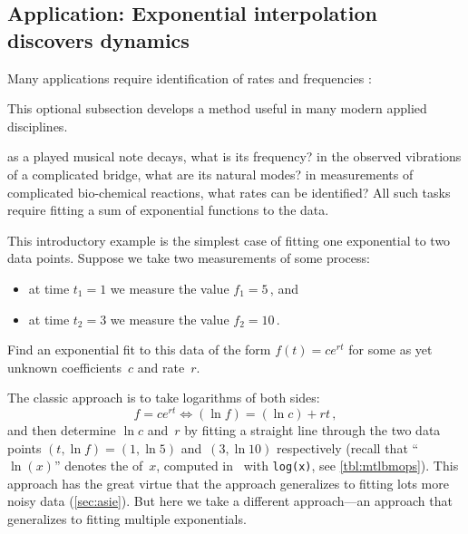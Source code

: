 









\begin{reduce}
\subsection{Application: Exponential interpolation discovers dynamics}
\label{sec:eidd}


Many applications require identification of rates and frequencies \cite[e.g.]{Pereyra2010}:
\begin{aside}
This optional subsection develops a method useful in many modern applied disciplines.
\end{aside}%
as a played musical note decays, what is its frequency?
in the observed vibrations of a complicated bridge, what are its natural modes?
in measurements of complicated bio-chemical reactions, what rates can be identified?
All such tasks require fitting a sum of exponential functions to the data.



\begin{example} \label{eg:eidd1}
This introductory example is the simplest case of fitting one exponential to two data points.
Suppose we take two measurements of some process: 
\begin{itemize}
\item at time \(t_1=1\) we measure the value \(f_1=5\)\,, and 
\item at time \(t_2=3\) we measure the value \(f_2=10\)\,.
\end{itemize}
Find an exponential fit to this data of the form \(f(t)=ce^{rt}\) for some as yet unknown coefficients~\(c\) and rate~\(r\).
\begin{solution} 
The classic approach is to take logarithms of both sides:
\begin{equation*}
f=ce^{rt} \iff (\ln f)=(\ln c)+rt\,,
\end{equation*}
and then determine \(\ln c\) and~\(r\) by fitting a straight line through the two data points \((t,\ln f)=(1,\ln5)\) and~\((3,\ln10)\) respectively
(recall that ``\(\ln(x)\)'' denotes the  of~\(x\),  computed in \script\ with \verb|log(x)|, see \autoref{tbl:mtlbmops}).
This approach has the great virtue that the approach generalizes to fitting lots more noisy data (\autoref{sec:asie}).
But here we take a different approach---an approach that generalizes to fitting multiple exponentials.



\end{solution}
\end{example}
\end{reduce}
